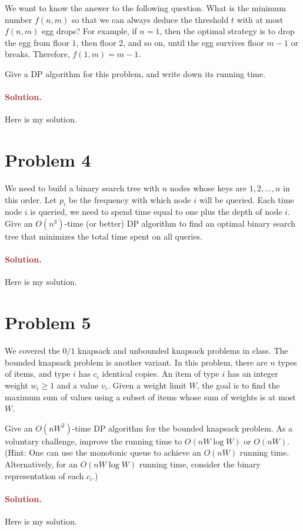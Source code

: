 We want to know the answer to the following question. What is the minimum number $f(n, m)$ so that we can always deduce the threshold $t$ with at most $f(n, m)$ egg drops? For example, if $n = 1$, then the optimal strategy is to drop the egg from floor $1$, then floor $2$, and so on, until the egg survives floor $m - 1$ or breaks. Therefore, $f(1, m) = m - 1$.

Give a DP algorithm for this problem, and write down its running time.

\paragraph{\textcolor{brown}{Solution.}}
Here is my solution.


\section*{Problem 4}
We need to build a binary search tree with $n$ nodes whose keys are $1, 2, \ldots, n$ in this order. Let $p_i$ be the frequency with which node $i$ will be queried. Each time node $i$ is queried, we need to spend time equal to one plus the depth of node $i$. Give an $O(n^3)$-time (or better) DP algorithm to find an optimal binary search tree that minimizes the total time spent on all queries.

\paragraph{\textcolor{brown}{Solution.}}
Here is my solution.


\section*{Problem 5}
We covered the $0/1$ knapsack and unbounded knapsack problems in class. The bounded knapsack problem is another variant. In this problem, there are $n$ types of items, and type $i$ has $c_i$ identical copies. An item of type $i$ has an integer weight $w_i \geq 1$ and a value $v_i$. Given a weight limit $W$, the goal is to find the maximum sum of values using a subset of items whose sum of weights is at most $W$.

Give an $O(nW^2)$-time DP algorithm for the bounded knapsack problem. As a voluntary challenge, improve the running time to $O(nW\log W)$ or $O(nW)$. (Hint: One can use the monotonic queue to achieve an $O(nW)$ running time. Alternatively, for an $O(nW \log W)$ running time, consider the binary representation of each $c_i$.)


\paragraph{\textcolor{brown}{Solution.}}
Here is my solution.

